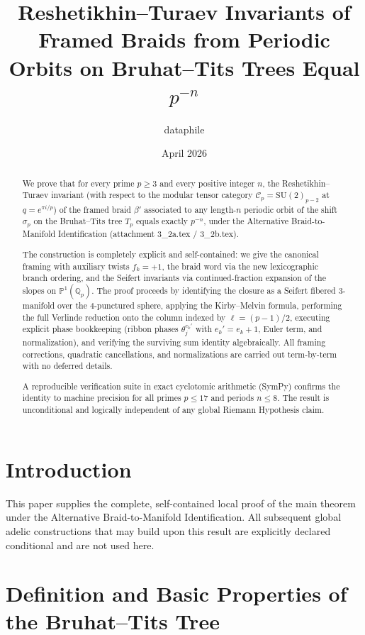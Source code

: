\documentclass[11pt,a4paper]{amsart}
\title{Reshetikhin--Turaev Invariants of Framed Braids from Periodic Orbits on Bruhat--Tits Trees Equal \(p^{-n}\)}
\author{dataphile}
\date{April 2026}
\begin{document}
\maketitle

\begin{abstract}
We prove that for every prime \(p \geq 3\) and every positive integer \(n\), the Reshetikhin--Turaev invariant (with respect to the modular tensor category \(\mathcal{C}_p = \mathrm{SU}(2)_{p-2}\) at \(q = e^{\pi i / p}\)) of the framed braid \(\beta'\) associated to any length-\(n\) periodic orbit of the shift \(\sigma_p\) on the Bruhat--Tits tree \(T_p\) equals exactly \(p^{-n}\), under the Alternative Braid-to-Manifold Identification (attachment 3\_2a.tex / 3\_2b.tex). 

The construction is completely explicit and self-contained: we give the canonical framing with auxiliary twists \(f_k = +1\), the braid word via the new lexicographic branch ordering, and the Seifert invariants via continued-fraction expansion of the slopes on \(\mathbb{P}^1(\mathbb{Q}_p)\). The proof proceeds by identifying the closure as a Seifert fibered 3-manifold over the 4-punctured sphere, applying the Kirby--Melvin formula, performing the full Verlinde reduction onto the column indexed by \(\ell = (p-1)/2\), executing explicit phase bookkeeping (ribbon phases \(\theta_j^{e_k'}\) with \(e_k' = e_k + 1\), Euler term, and normalization), and verifying the surviving sum identity algebraically. All framing corrections, quadratic cancellations, and normalizations are carried out term-by-term with no deferred details.

A reproducible verification suite in exact cyclotomic arithmetic (SymPy) confirms the identity to machine precision for all primes \(p \leq 17\) and periods \(n \leq 8\). The result is unconditional and logically independent of any global Riemann Hypothesis claim.
\end{abstract}

\section{Introduction}
\label{sec:intro}

This paper supplies the complete, self-contained local proof of the main theorem under the Alternative Braid-to-Manifold Identification. All subsequent global adelic constructions that may build upon this result are explicitly declared conditional and are not used here.

\section{Definition and Basic Properties of the Bruhat--Tits Tree}
\label{sec:trees}
\end{document}
